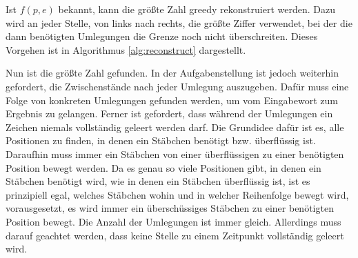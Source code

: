 \documentclass[a4paper,10pt,ngerman]{scrartcl}
\begin{document}
Ist $f(p, e)$ bekannt, kann die größte Zahl greedy rekonstruiert werden. Dazu wird an jeder Stelle, von links nach rechts, die größte Ziffer verwendet, bei der die dann benötigten Umlegungen die Grenze noch nicht überschreiten. Dieses Vorgehen ist in Algorithmus \ref{alg:reconstruct} dargestellt.
Nun ist die größte Zahl gefunden. 
In der Aufgabenstellung ist jedoch weiterhin gefordert, die Zwischenstände nach jeder Umlegung auszugeben.
Dafür muss eine Folge von konkreten Umlegungen gefunden werden, um vom Eingabewort zum Ergebnis zu gelangen. 
Ferner ist gefordert, dass während der Umlegungen ein Zeichen niemals vollständig geleert werden darf. 
Die Grundidee dafür ist es, alle Positionen zu finden, in denen ein Stäbchen benötigt bzw. überflüssig ist. 
Daraufhin muss immer ein Stäbchen von einer überflüssigen zu einer benötigten Position bewegt werden. 
Da es genau so viele Positionen gibt, in denen ein Stäbchen benötigt wird, wie in denen ein Stäbchen überflüssig ist, ist es prinzipiell egal, welches Stäbchen wohin und in welcher Reihenfolge bewegt wird, vorausgesetzt, es wird immer ein überschüssiges Stäbchen zu einer benötigten Position bewegt.
Die Anzahl der Umlegungen ist immer gleich. 
Allerdings muss darauf geachtet werden, dass keine Stelle zu einem Zeitpunkt vollständig geleert wird. 
\end{document}
